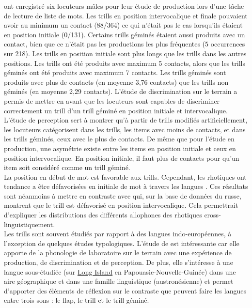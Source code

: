 \textcite{raymondInitialMedialGeminate2005} ont enregistré six locuteurs mâles pour leur étude de production lors d'une tâche de lecture de liste de mots. Les trills en position intervocalique et finale pouvaient avoir au minimum un contact (88/364) ce qui n'était pas le cas lorsqu'ils étaient en position initiale (0/131). Certains trills géminés étaient aussi produits avec un contact, bien que ce n'était pas les productions les plus fréquentes (5 occurrences sur 218). Les trills en position initiale sont plus longs que les trills dans les autres positions.
Les trills ont été produits avec maximum 5 contacts, alors que les trills géminés ont été produits avec maximum 7 contacts.
Les trills géminés sont produits avec plus de contacts (en moyenne 3,76 contacts) que les trills non géminés (en moyenne 2,29 contacts).
L'étude de discrimination sur le terrain a permis de mettre en avant que les locuteurs sont capables de discriminer correctement un trill d'un trill géminé en position initiale et intervocalique. L'étude de perception sert à montrer qu'à partir de trills modifiés artificiellement, les locuteurs catégorisent dans les trills, les items avec moins de contacts, et dans les trills géminés, ceux avec le plus de contacts. De même que pour l'étude en production, une asymétrie existe entre les items en position initiale et ceux en position intervocalique. En position initiale, il faut plus de contacts pour qu'un item soit considéré comme un trill géminé.\\

La position en début de mot est favorable aux trills. Cependant, les rhotiques ont tendance a être défavorisées en initiale de mot à travers les langues \parencite{labruneWordinitialRhoticAvoidance2021}. Ces résultats sont néanmoins à mettre en contraste avec \textcite{kavitskayaTrillsPalatalizationConsequences2009} qui, sur la base de données du russe, montrent que le trill est défavorisé en position intervocalique. Cela permettrait d'expliquer les distributions des différents allophones des rhotiques cross-linguistiquement.\\


Les trills sont souvent étudiés par rapport à des langues indo-européennes, à l'exception de quelques études typologiques.
L'étude de \textcite{raymondInitialMedialGeminate2005} est intéressante car elle apporte de la phonologie de laboratoire sur le terrain avec une expérience de production, de discrimination et de perception. De plus, elle s'intéresse à une langue sous-étudiée (sur \href{https://www.google.com/maps/place/Matafum,+Papouasie-Nouvelle-Guin\%C3\%A9e/@-5.2182111,146.4002482,9.13z/data=!4m13!1m7!3m6!1s0x68f3e3520a551b3f:0x58a83294038393a4!2sLong+Island!3b1!8m2!3d-5.3535839!4d147.1464245!3m4!1s0x68f3fd93309894d3:0x2df33848a2f3c3c0!8m2!3d-5.3707325!4d147.0343745}{Long Island} en Papouasie-Nouvelle-Guinée) dans une aire géographique et dans une famille linguistique (austronésienne) et permet d'apporter des éléments de réflexion sur le contraste que peuvent faire les langues entre trois sons  : le flap, le trill et le trill géminé.


